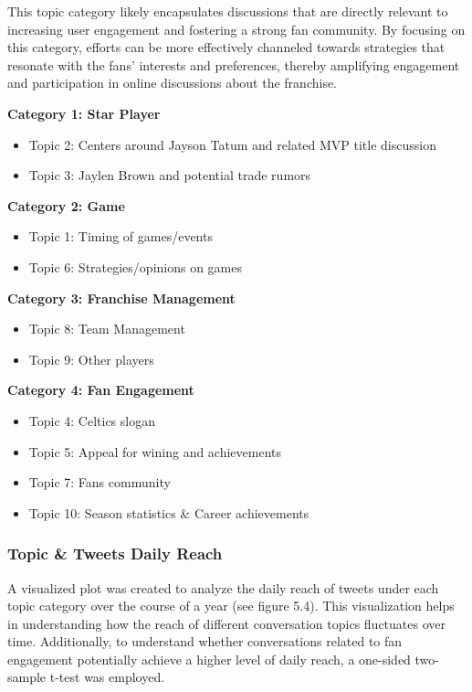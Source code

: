 \documentclass[
]{book}
\begin{document}
This topic category likely encapsulates discussions that are directly relevant to increasing user engagement and fostering a strong fan community. By focusing on this category, efforts can be more effectively channeled towards strategies that resonate with the fans' interests and preferences, thereby amplifying engagement and participation in online discussions about the franchise.

\textbf{Category 1: Star Player}

\begin{itemize}
\item
  Topic 2: Centers around Jayson Tatum and related MVP title discussion
\item
  Topic 3: Jaylen Brown and potential trade rumors
\end{itemize}

\textbf{Category 2: Game}

\begin{itemize}
\item
  Topic 1: Timing of games/events
\item
  Topic 6: Strategies/opinions on games
\end{itemize}

\textbf{Category 3: Franchise Management}

\begin{itemize}
\item
  Topic 8: Team Management
\item
  Topic 9: Other players
\end{itemize}

\textbf{Category 4: Fan Engagement}

\begin{itemize}
\item
  Topic 4: Celtics slogan
\item
  Topic 5: Appeal for wining and achievements
\item
  Topic 7: Fans community
\item
  Topic 10: Season statistics \& Career achievements
\end{itemize}

\hypertarget{topic-tweets-daily-reach}{%
\subsubsection{Topic \& Tweets Daily Reach}\label{topic-tweets-daily-reach}}

A visualized plot was created to analyze the daily reach of tweets under each topic category over the course of a year (see figure 5.4). This visualization helps in understanding how the reach of different conversation topics fluctuates over time. Additionally, to understand whether conversations related to fan engagement potentially achieve a higher level of daily reach, a one-sided two-sample t-test was employed.
\end{document}
